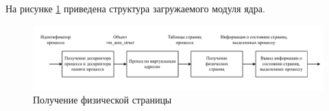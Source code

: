 На рисунке \ref{img:structure} приведена структура загружаемого модуля ядра.

\begin{figure}[H]
	\begin{center}
		\includegraphics[scale=0.75]{inc/img/structure.pdf}
	\end{center}
	\captionsetup{justification=centering}
	\caption{Получение физической страницы}
	\label{img:structure}
\end{figure}
